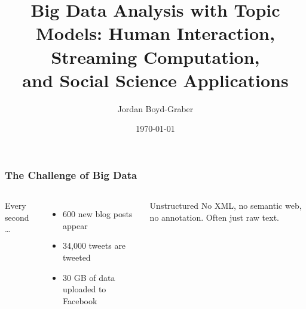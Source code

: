 \documentclass[compress]{beamer}
\title{Big Data Analysis with Topic Models: Human Interaction, Streaming Computation, \\and Social Science Applications}
\author{Jordan Boyd-Graber}
\date{\today}
\begin{document}




\begin{frame}
\frametitle{The Challenge of Big Data}

\begin{columns}


Every second \dots
\begin{itemize}
  \item 600 new blog posts appear
  \item 34,000 tweets are tweeted
  \item 30 GB of data uploaded to Facebook
\end{itemize}
\pause

\begin{block}{Unstructured}
  No XML, no semantic web, no annotation.  Often just raw text.
\end{block}



\end{columns}

\end{frame}
\end{document}
